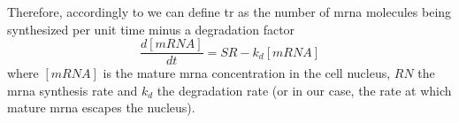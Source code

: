 Therefore, accordingly to \cite{what_is_tr} we can define \gls{tr} as the number of \gls{mrna} molecules being synthesized per unit time minus a degradation factor
\begin{equation}
  \frac{d[mRNA]}{dt} = SR - k_d [mRNA]
\end{equation}
\noindent where $[mRNA]$ is the mature \gls{mrna} concentration in the cell nucleus, $RN$ the \gls{mrna} synthesis rate and $k_d$ the degradation rate (or in our case, the rate at which mature \gls{mrna} escapes the nucleus).
